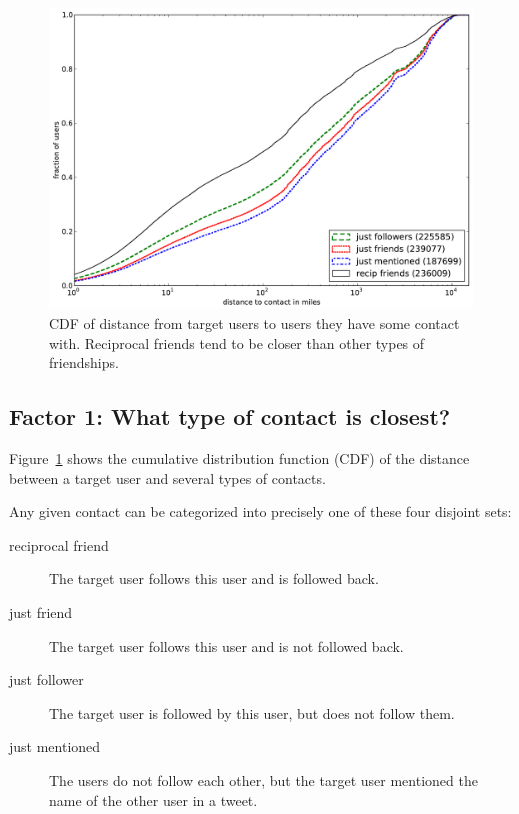 \documentclass[letterpaper]{article}
\begin{document}
\begin{figure}[tbh]
\centering
\includegraphics[width=\linewidth]{figures/edge_types_cuml.pdf}
\caption{
CDF of distance from target users to users they have some contact
with.
%
Reciprocal friends tend to be closer than other types of friendships.
}
\label{fig:EdgeTypesCuml}
\end{figure}





\subsection{Factor 1: What type of contact is closest?}
\label{sec:EdgeTypes}

Figure~\ref{fig:EdgeTypesCuml} shows the cumulative distribution
function (CDF) of the distance between a target user and several types of
contacts.

Any given contact can be categorized into precisely one of these four disjoint
sets:
\begin{description}
\item[reciprocal friend] The target user follows this user and is followed
    back.
\item[just friend] The target user follows this user and is not followed
    back.
\item[just follower] The target user is followed by this user, but does
    not follow them.
\item[just mentioned] The users do not follow each other, but the target
    user mentioned the name of the other user in a tweet.
\end{description}
\end{document}
